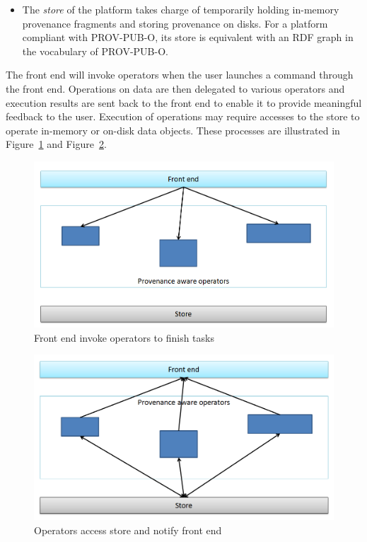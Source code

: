 \begin{itemize}
	\item The \emph{store} of the platform takes charge of temporarily holding in-memory provenance fragments and storing provenance on disks. For a platform compliant with PROV-PUB-O, its store is equivalent with an RDF graph in the vocabulary of PROV-PUB-O.
\end{itemize}
The front end will invoke operators when the user launches a command through the front end. Operations on data are then delegated to various operators and execution results are sent back to the front end to enable it to provide meaningful feedback to the user. Execution of operations may require accesses to the store to operate in-memory or on-disk data objects. These processes are illustrated in Figure~\ref{fig:invoke} and Figure~\ref{fig:execute}.
\begin{figure}
	\centering
	\includegraphics[width=\textwidth]{invoke.png}
	\caption{Front end invoke operators to finish tasks}
	\label{fig:invoke}
\end{figure}
\begin{figure}
	\centering
	\includegraphics[width=\textwidth]{execute.png}
	\caption{Operators access store and notify front end}
	\label{fig:execute}
\end{figure}
